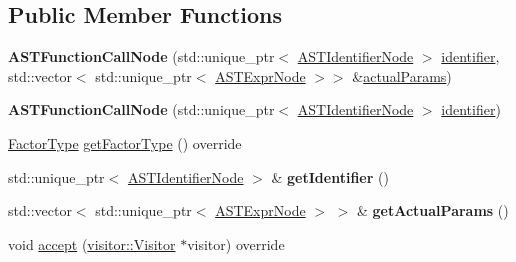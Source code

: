 \subsection*{Public Member Functions}
\begin{DoxyCompactItemize}
\item 
\mbox{\label{classparser_1_1ast_1_1ASTFunctionCallNode_a671c8a09cc22abb8a34f1f3945bc9360}} 
{\bfseries A\+S\+T\+Function\+Call\+Node} (std\+::unique\+\_\+ptr$<$ \hyperlink{classparser_1_1ast_1_1ASTIdentifierNode}{A\+S\+T\+Identifier\+Node} $>$ \hyperlink{classparser_1_1ast_1_1ASTFunctionCallNode_a77b1b97d1a948b8f48e2b67ccedda22b}{identifier}, std\+::vector$<$ std\+::unique\+\_\+ptr$<$ \hyperlink{classparser_1_1ast_1_1ASTExprNode}{A\+S\+T\+Expr\+Node} $>$$>$ \&\hyperlink{classparser_1_1ast_1_1ASTFunctionCallNode_abb9d7f3a34dc376b885b321dc0cef0d3}{actual\+Params})
\item 
\mbox{\label{classparser_1_1ast_1_1ASTFunctionCallNode_aefa1003a3388b80e2144ec8fd7161b18}} 
{\bfseries A\+S\+T\+Function\+Call\+Node} (std\+::unique\+\_\+ptr$<$ \hyperlink{classparser_1_1ast_1_1ASTIdentifierNode}{A\+S\+T\+Identifier\+Node} $>$ \hyperlink{classparser_1_1ast_1_1ASTFunctionCallNode_a77b1b97d1a948b8f48e2b67ccedda22b}{identifier})
\item 
\hyperlink{ASTFactorNode_8h_afbe2fcc03ef15b74a0c1ed1cda7ab0e8}{Factor\+Type} \hyperlink{classparser_1_1ast_1_1ASTFunctionCallNode_a1c40c8e98284fd4389b34da161e8b39a}{get\+Factor\+Type} () override
\item 
\mbox{\label{classparser_1_1ast_1_1ASTFunctionCallNode_ad5ef8ae75a99a84683f5314bab355dc4}} 
std\+::unique\+\_\+ptr$<$ \hyperlink{classparser_1_1ast_1_1ASTIdentifierNode}{A\+S\+T\+Identifier\+Node} $>$ \& {\bfseries get\+Identifier} ()
\item 
\mbox{\label{classparser_1_1ast_1_1ASTFunctionCallNode_a550822b2c150f4b37d7780428c565e2c}} 
std\+::vector$<$ std\+::unique\+\_\+ptr$<$ \hyperlink{classparser_1_1ast_1_1ASTExprNode}{A\+S\+T\+Expr\+Node} $>$ $>$ \& {\bfseries get\+Actual\+Params} ()
\item 
void \hyperlink{classparser_1_1ast_1_1ASTFunctionCallNode_ad7ff48d8398744b1211a6da0399a197b}{accept} (\hyperlink{classvisitor_1_1Visitor}{visitor\+::\+Visitor} $\ast$visitor) override
\end{DoxyCompactItemize}
